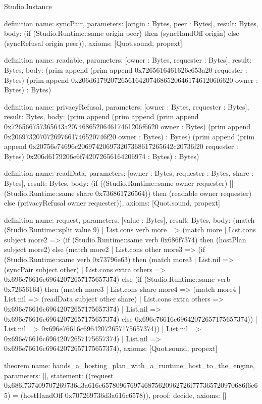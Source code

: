 \begin{lexlean}{Studio.Instance}
\begin{semanticmodule}
definition{
  name: syncPair,
  parameters: [origin : Bytes, peer : Bytes],
  result: Bytes,
  body: (if (Studio.Runtime::same origin peer) then (syncHandOff origin) else (syncRefusal origin peer)),
  axioms: [Quot.sound, propext]
}

definition{
  name: readable,
  parameters: [owner : Bytes, requester : Bytes],
  result: Bytes,
  body: (prim append (prim append 0x7265616461626c653a20 requester : Bytes) (prim append 0x206d61792072656164207468652064617461206f6620 owner : Bytes) : Bytes)
}

definition{
  name: privacyRefusal,
  parameters: [owner : Bytes, requester : Bytes],
  result: Bytes,
  body: (prim append (prim append (prim append 0x726566757365643a207468652064617461206f6620 owner : Bytes) (prim append 0x206973207072697661746520746f20 owner : Bytes) : Bytes) (prim append (prim append 0x20756e74696c206974206973207368617265642c20736f20 requester : Bytes) 0x206d6179206e6f742072656164206974 : Bytes) : Bytes)
}

definition{
  name: readData,
  parameters: [owner : Bytes, requester : Bytes, share : Bytes],
  result: Bytes,
  body: (if ((Studio.Runtime::same owner requester) || (Studio.Runtime::same share 0x736861726564)) then (readable owner requester) else (privacyRefusal owner requester)),
  axioms: [Quot.sound, propext]
}

definition{
  name: request,
  parameters: [value : Bytes],
  result: Bytes,
  body: (match (Studio.Runtime::split value 9)
    | List.cons verb more => (match more
      | List.cons subject more2 => (if (Studio.Runtime::same verb 0x686f7374) then (hostPlan subject more2) else (match more2
        | List.cons other more3 => (if (Studio.Runtime::same verb 0x73796e63) then (match more3
          | List.nil => (syncPair subject other)
          | List.cons extra others => 0x696e76616c69642072657175657374) else (if (Studio.Runtime::same verb 0x72656164) then (match more3
          | List.cons share more4 => (match more4
            | List.nil => (readData subject other share)
            | List.cons extra others => 0x696e76616c69642072657175657374)
          | List.nil => 0x696e76616c69642072657175657374) else 0x696e76616c69642072657175657374))
        | List.nil => 0x696e76616c69642072657175657374))
      | List.nil => 0x696e76616c69642072657175657374)
    | List.nil => 0x696e76616c69642072657175657374),
  axioms: [Quot.sound, propext]
}

theorem{
  name: hands_a_hosting_plan_with_a_runtime_host_to_the_engine,
  parameters: [],
  statement: ((request 0x686f737409707269736d3a616c6578096769746875620962726f777365720970686f6e65) = (hostHandOff 0x707269736d3a616c6578)),
  proof: decide{},
  axioms: []
}


\end{semanticmodule}
\end{lexlean}

